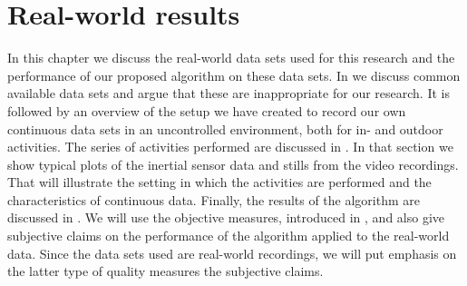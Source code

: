 
\chapter{Real-world results}

\label{Chapter6} %


In this chapter we discuss the real-world data sets used for this research and the performance of our proposed algorithm on these data sets.
In  we discuss common available data sets and argue that these are inappropriate for our research.
It is followed by an overview of the setup we have created to record our own continuous data sets in an uncontrolled environment, both for in- and outdoor activities.
The series of activities performed are discussed in .
In that section we show typical plots of the inertial sensor data and stills from the video recordings.
That will illustrate the setting in which the activities are performed and the characteristics of continuous data.
Finally, the results of the algorithm are discussed in .
We will use the objective measures, introduced in , and also give subjective claims on the performance of the algorithm applied to the real-world data.
Since the data sets used are real-world recordings, we will put emphasis on the latter type of quality measures \ie the subjective claims.



